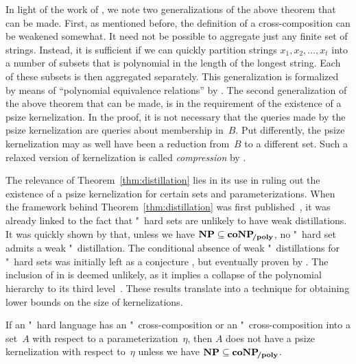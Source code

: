 In light of the work of \textcite{bodlaender2014kernelization}, we note two generalizations of the above theorem that can be made.
First, as mentioned before, the definition of a cross-composition can be weakened somewhat.
It need not be possible to aggregate just any finite set of strings.
Instead, it is sufficient if we can quickly partition strings $x_1, x_2, \ldots, x_t$ into a number of subsets that is polynomial in the length of the longest string.
Each of these subsets is then aggregated separately.
This generalization is formalized by means of \enquote{polynomial equivalence relations} by \textcite{bodlaender2014kernelization}.
The second generalization of the above theorem that can be made, is in the requirement of the existence of a psize kernelization.
In the proof, it is not necessary that the queries made by the psize kernelization are queries about membership in~$B$.
Put differently, the psize kernelization may as well have been a reduction from~$B$ to a different set.
Such a relaxed version of kernelization is called \emph{compression} by \textcite{bodlaender2014kernelization}.

The relevance of Theorem~\ref{thm:distillation} lies in its use in ruling out the existence of a psize kernelization for certain sets and parameterizations.
When the framework behind Theorem~\ref{thm:distillation} was first published~\parencite{bodlaender2009problems}, it was already linked to the fact that "~hard sets are unlikely to have weak distillations.
It was quickly shown by \textcite{fortnow2011infeasibility} that, unless we have $\textnormal{\textbf{NP}} \subseteq \textnormal{\textbf{coNP}}\!_\textnormal{\textbf{/poly}}$, no "~hard set admits a weak "~distillation.
The conditional absence of weak "~distillations for "~hard sets was initially left as a conjecture \parencite{bodlaender2009problems}, but eventually proven by \textcite{drucker2015new}.
The inclusion of  in  is deemed unlikely, as it implies a collapse of the polynomial hierarchy to its third level~\parencite{yap1983some}.
These results translate into a technique for obtaining lower bounds on the size of kernelizations.
\begin{corollary}
\label{cor:lower_bound}%
  If an "~hard language has an "~cross-composition or an "~cross-composition into a set~$A$ with respect to a parameterization~$\eta$, then $A$ does not have a psize kernelization with respect to~$\eta$ unless we have $\textnormal{\textbf{NP}} \subseteq \textnormal{\textbf{coNP}}\!_\textnormal{\textbf{/poly}}$.
\end{corollary}

